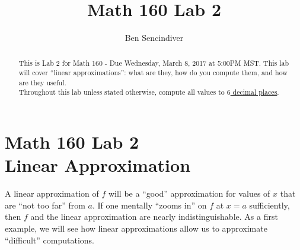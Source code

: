 \documentclass[handout,nooutcomes]{ximera}
\title{Math 160 Lab 2}
\author{Ben Sencindiver} %
\begin{document}
\section{Math 160 Lab 2 \\ Linear Approximation}

\begin{abstract}
This is Lab 2 for Math 160 - Due Wednesday, March 8, 2017 at 5:00PM MST.
This lab will cover ``linear approximations'': what are they,
how do you compute them, and how are they useful.\\

Throughout this lab unless stated otherwise, compute all values to \underline{$6$ decimal places}.
\end{abstract}

\maketitle


A linear approximation of $f$ will be a ``good'' approximation for values of
$x$ that are ``not too far'' from $a$.
If one mentally ``zooms in'' on $f$ at $x=a$ sufficiently, then $f$ and the linear
approximation are nearly indistinguishable. As a first example, we
will see how linear approximations allow us to approximate
``difficult'' computations.
\end{document}
